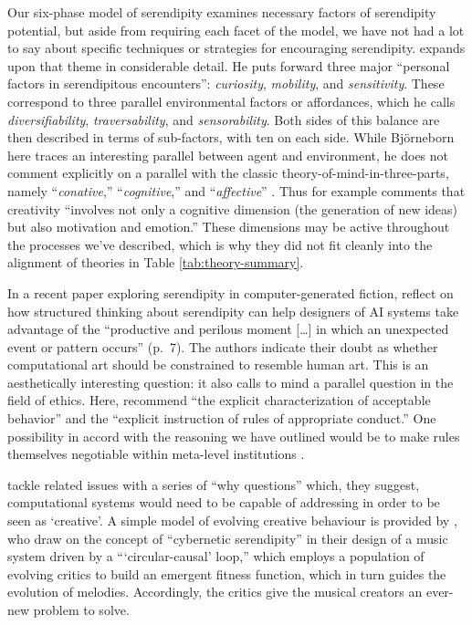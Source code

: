 Our six-phase model of serendipity examines necessary factors of serendipity
potential, but aside from requiring each facet of the model, we have
not had a lot to say about specific techniques or strategies for
encouraging serendipity.  \citet{bjorneborn2017three} expands upon
that theme in considerable detail.  He puts forward three major
``personal factors in serendipitous encounters'': \emph{curiosity},
\emph{mobility}, and \emph{sensitivity}.  These correspond to three
parallel environmental factors or affordances, which he calls
\emph{diversifiability}, \emph{traversability}, and
\emph{sensorability}.  Both sides of this balance are then described
in terms of sub-factors, with ten on each side.  While Bj\"orneborn
here traces an interesting parallel between agent and environment, he
does not comment explicitly on a parallel with the classic theory-of-mind-in-three-parts, namely ``\emph{conative},''
``\emph{cognitive},'' and ``\emph{affective}''
\cite{hilgard1980trilogy}.
Thus for example \citet[p.~347]{boden1998creativity} comments that
creativity ``involves not only a cognitive dimension (the generation
of new ideas) but also motivation and emotion.''
These dimensions may be active throughout the processes we've
described, which is why they did not fit cleanly into the alignment of
theories in Table \ref{tab:theory-summary}.

In a recent paper exploring serendipity in computer-generated fiction,
\citet{mccallum2018} reflect on how structured thinking about
serendipity can help designers of AI systems take advantage of the
``productive and perilous moment [\ldots] in which an unexpected event
or pattern occurs'' (p.~7).  The authors indicate their doubt as
whether computational art should be constrained to resemble human art.
This is an aesthetically interesting question: it also calls to mind
a parallel question in the field of ethics.
Here, \citet{caliskan2017semantics} recommend ``the explicit
characterization of acceptable behavior'' and the ``explicit
instruction of rules of appropriate conduct.''  One possibility in
accord with the reasoning we have outlined would be to make rules
themselves negotiable within meta-level institutions
\cite{corneli2016institutional}.

\citet{gucklesberger2017addressing} tackle related issues with a
series of ``why questions'' which, they suggest, computational systems
would need to be capable of addressing in order to be seen as
`creative'.  A simple model of evolving creative behaviour is provided
by \citet{loughran2018serendipity}, who draw on the concept of
``cybernetic serendipity'' in their design of a music system driven by
a {``}`circular-causal' loop,{''} which employs a population of
evolving critics to build an emergent fitness function, which in turn
guides the evolution of melodies.  Accordingly, the critics give the
musical creators an ever-new problem to solve.


